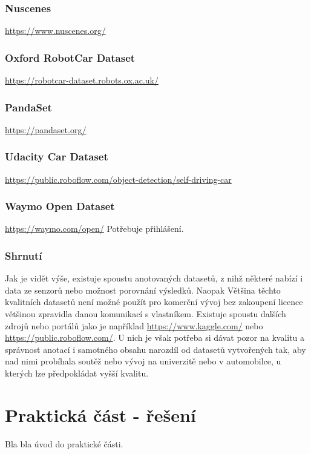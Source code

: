 \documentclass[czech, bc, kky, he, iso690alph]{fasthesis}
\begin{document}
  			\subsection{Nuscenes}
  				\href{https://www.nuscenes.org/}{https://www.nuscenes.org/}
  			\subsection{Oxford RobotCar Dataset}
  				\href{https://robotcar-dataset.robots.ox.ac.uk/}{https://robotcar-dataset.robots.ox.ac.uk/}
  			\subsection{PandaSet}
  				\href{https://pandaset.org/}{https://pandaset.org/}
  			\subsection{Udacity Car Dataset}
  				\href{https://public.roboflow.com/object-detection/self-driving-car}{https://public.roboflow.com/object-detection/self-driving-car}
  			\subsection{Waymo Open Dataset}
  				\href{https://waymo.com/open/}{https://waymo.com/open/} Potřebuje přihlášení.
  			\subsection{Shrnutí}
  				Jak je vidět výše, existuje spoustu anotovaných datasetů, z nihž některé nabízí i data ze senzorů nebo možnost porovnání výsledků. Naopak Většina těchto kvalitních datasetů není možné použít pro komerční vývoj bez zakoupení licence většinou zpravidla danou komunikací s vlastníkem. Existuje spoustu dalších zdrojů nebo portálů jako je například \href{https://www.kaggle.com/}{https://www.kaggle.com/} nebo \href{https://public.roboflow.com/}{https://public.roboflow.com/}. U nich je však potřeba si dávat pozor na kvalitu a správnost anotací i samotného obsahu narozdíl od datasetů vytvořených tak, aby nad nimi probíhala soutěž nebo vývoj na univerzitě nebo v automobilce, u kterých lze předpokládat vyšší kvalitu.
    \chapter{Praktická část - řešení}
        Bla bla úvod do praktické části.
\end{document}
